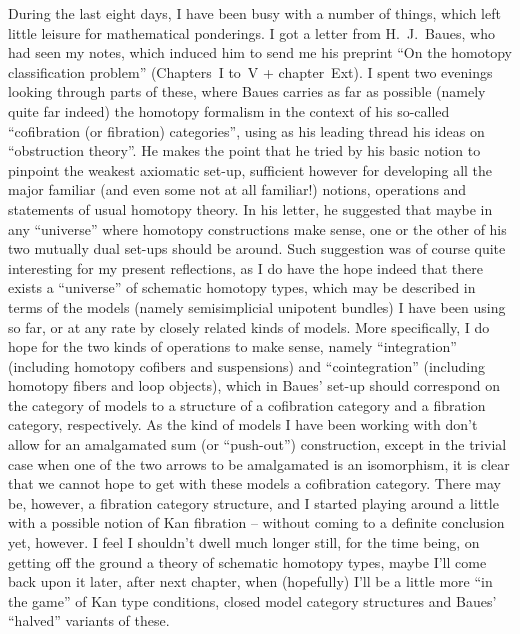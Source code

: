 \bigbreak

\noindent\hfill{}\par

\label{sec:125}%
During the last eight days, I have been busy with a number of things,
which left little leisure for mathematical ponderings. I got a letter
from H.~J.~Baues, who had seen my notes, which induced him to send me
his preprint ``On the homotopy classification problem'' (Chapters~I
to~V + chapter~Ext). I spent two evenings looking through parts of
these, where Baues carries as far as possible (namely quite far
indeed) the homotopy formalism in the context of his so-called
``cofibration (or fibration) categories'', using as his leading
thread his ideas on ``obstruction theory''. He makes the point that he
tried by his basic notion to pinpoint the weakest axiomatic set-up,
sufficient however for developing all the major familiar (and even
some not at all familiar!) notions, operations and statements of usual
homotopy theory. In his letter, he suggested that maybe in any
``universe'' where homotopy constructions make sense, one or the other
of his two mutually dual set-ups should be around. Such suggestion was
of course quite interesting for my present reflections, as I do have
the hope indeed that there exists a ``universe'' of schematic homotopy
types, which may be described in terms of the models (namely
semisimplicial unipotent bundles) I have been using so far, or at any
rate by closely related kinds of models. More specifically, I do hope
for the two kinds of operations to make sense, namely ``integration''
(including homotopy cofibers and suspensions) and ``cointegration''
(including homotopy fibers and loop objects), which in Baues' set-up
should correspond on the category of models to a structure of a
cofibration category and a fibration category, respectively. As the
kind of models I have been working with don't allow for an
amalgamated sum (or ``push-out'') construction, except in the trivial
case when one of the two arrows to be amalgamated is an isomorphism,
it is clear that we cannot hope to get with these models a cofibration
category. There may be, however, a fibration category structure, and I
started playing around a little with a possible notion of Kan
fibration -- without coming to a definite conclusion yet, however. I
feel I shouldn't dwell much longer still, for the time being, on
getting off the ground a theory of schematic homotopy types, maybe
I'll come back upon it later, after next chapter, when (hopefully)
I'll be a little more ``in the game'' of Kan type conditions, closed
model category structures and Baues' ``halved'' variants of these.

